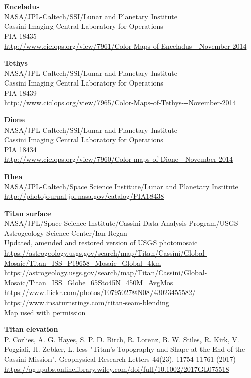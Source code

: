 \documentclass[Orbiter User Manual.tex]{subfiles}
\begin{document}
\textbf{Enceladus}\\
NASA/JPL-Caltech/SSI/Lunar and Planetary Institute\\
Cassini Imaging Central Laboratory for Operations\\
PIA 18435\\
\url{http://www.ciclops.org/view/7961/Color-Maps-of-Enceladus---November-2014}

\textbf{Tethys}\\
NASA/JPL-Caltech/SSI/Lunar and Planetary Institute\\
Cassini Imaging Central Laboratory for Operations\\
PIA 18439\\
\url{http://www.ciclops.org/view/7965/Color-Maps-of-Tethys---November-2014}

\textbf{Dione}\\
NASA/JPL-Caltech/SSI/Lunar and Planetary Institute\\
Cassini Imaging Central Laboratory for Operations\\
PIA 18434\\
\url{http://www.ciclops.org/view/7960/Color-maps-of-Dione---November-2014}

\textbf{Rhea}\\
NASA/JPL-Caltech/Space Science Institute/Lunar and Planetary Institute\\
\url{http://photojournal.jpl.nasa.gov/catalog/PIA18438}

\textbf{Titan surface}\\
NASA/JPL/Space Science Institute/Cassini Data Analysis Program/USGS Astrogeology
Science Center/Ian Regan\\
Updated, amended and restored version of USGS photomosaic\\
\url{https://astrogeology.usgs.gov/search/map/Titan/Cassini/Global-Mosaic/Titan_ISS_P19658_Mosaic_Global_4km}\\
\url{https://astrogeology.usgs.gov/search/map/Titan/Cassini/Global-Mosaic/Titan_ISS_Globe_65Sto45N_450M_AvgMos}\\
\url{https://www.flickr.com/photos/10795027@N08/43023455582/}\\
\url{https://www.insaturnsrings.com/titan-seam-blending}\\
Map used with permission

\textbf{Titan elevation}\\
P. Corlies, A. G. Hayes, S. P. D. Birch, R. Lorenz, B. W. Stiles, R. Kirk, V.
Poggiali, H. Zebker, L. Iess "Titan's Topography and Shape at the End of the
Cassini Mission", Geophysical Research Letters 44(23), 11754-11761 (2017)\\
\url{https://agupubs.onlinelibrary.wiley.com/doi/full/10.1002/2017GL075518}
\end{document}
